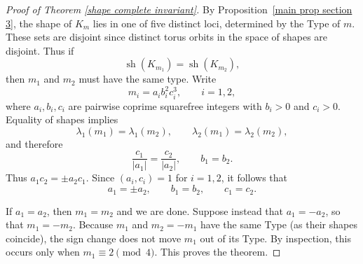 \documentclass[table]{amsart}
\numberwithin{equation}{section}
\begin{document}
\begin{proof}[Proof of Theorem \ref{shape complete invariant}]
By Proposition~\ref{main prop section 3}, the shape of $K_m$ lies in one of five distinct loci, determined by the Type of $m$. These sets are disjoint since distinct torus orbits in the space of shapes are disjoint. Thus if
\[
\operatorname{sh}(K_{m_1})=\operatorname{sh}(K_{m_2}),
\]
then $m_1$ and $m_2$ must have the same type. Write 
\[
m_i = a_i b_i^2 c_i^3,
\qquad i=1,2,
\]
where $a_i,b_i,c_i$ are pairwise coprime squarefree integers with $b_i>0$ and $c_i>0$.  Equality of shapes implies
\[
\lambda_1(m_1)=\lambda_1(m_2), \qquad 
\lambda_2(m_1)=\lambda_2(m_2),
\]
and therefore
\[
\frac{c_1}{|a_1|}=\frac{c_2}{|a_2|}, 
\qquad 
b_1=b_2.
\]
Thus $a_1 c_2 = \pm a_2 c_1$. Since $(a_i,c_i)=1$ for $i=1,2$, it follows that
\[
a_1=\pm a_2,\qquad b_1=b_2,\qquad c_1=c_2.
\]

If $a_1=a_2$, then $m_1=m_2$ and we are done. Suppose instead that $a_1=-a_2$, so that $m_1=-m_2$. Because $m_1$ and $m_2=-m_1$ have the same Type (as their shapes coincide), the sign change does not move $m_1$ out of its Type. By inspection, this occurs only when $m_1 \equiv 2 \pmod{4}$. This proves the theorem.
\end{proof}
\end{document}
